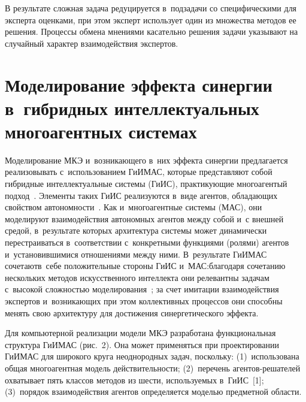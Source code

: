 \begin{multicols}{2}
  
  В результате сложная задача редуцируется в~подзадачи со специфическими 
для эксперта оценками, при этом эксперт использует один из множества 
методов ее решения. Процессы обмена мнениями касательно решения задачи 
указывают на случайный характер взаимодействия экспертов. 

\vspace*{-6pt}
  
\section{Моделирование эффекта синергии в~гибридных 
интеллектуальных многоагентных системах}

\vspace*{-2pt}

  Моделирование МКЭ и~возникающего в~них эффекта синергии предлагается 
реализовывать с~использованием ГиИМАС, которые представляют собой 
гибридные интеллектуальные системы (ГиИС), практикующие многоагентый 
подход~\cite{14-kir}. Элементы таких ГиИС реализуются в~виде агентов, 
обладающих свойством автономности~\cite{15-kir}. Как и~многоагентные 
системы (МАС), они моделируют взаимодействия автономных агентов между 
собой и~с внешней средой, в~результате которых архитектура системы может 
динамически перестраиваться в~соответствии с~конкретными функциями 
(ролями) агентов и~установившимися отношениями между ними. В~результате 
ГиИМАС сочетают\linebreak в~себе положительные стороны ГиИС и~МАС:\linebreak благодаря 
сочетанию нескольких методов искусственного интеллекта они релевантны 
задачам с~высокой сложностью моделирования~\cite{14-kir}; за счет имитации 
взаимодействия экспертов и~возни\-ка\-ющих при этом коллективных процессов 
они способны менять свою архитектуру для достижения синергетического 
эффекта. 
  
  Для компьютерной реализации модели МКЭ разработана функциональная 
структура ГиИМАС (рис.~2). Она может применяться при проектировании 
ГиИМАС для широкого круга неоднородных задач, поскольку: 
(1)~использована общая многоагентная модель действительности; (2)~перечень 
аген\-тов-ре\-ша\-те\-лей охватывает пять классов методов из шести, 
используемых в~ГиИС~[1]; (3)~порядок взаимодействия агентов определяется 
моделью предметной области.
  

\begin{table*}[b]\small %
\vspace*{-6pt}
\begin{center}
\vspace*{2ex}


\end{center}
\end{table*}
\end{multicols}
